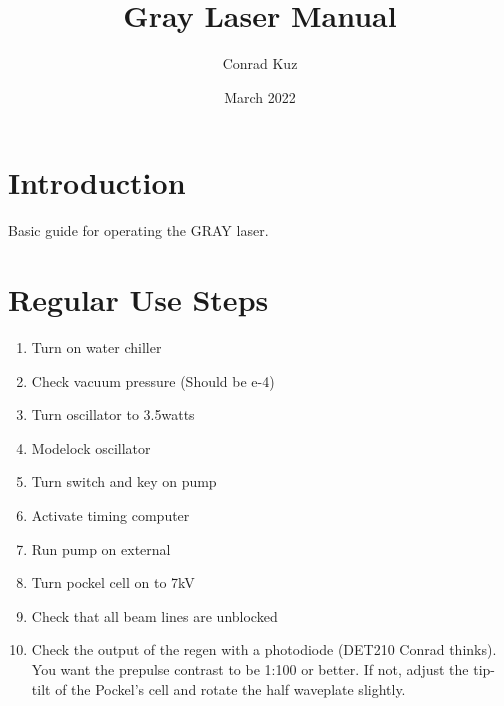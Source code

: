 \documentclass{article}
\title{Gray Laser Manual}
\author{Conrad Kuz}
\date{March 2022}
\begin{document}
\maketitle

\section{Introduction}
Basic guide for operating the GRAY laser.

\section{Regular Use Steps}
\begin{enumerate}
    \item Turn on water chiller
    \item Check vacuum pressure (Should be e-4)
    \item Turn oscillator to 3.5watts
    \item Modelock oscillator
    \item Turn switch and key on pump
    \item Activate timing computer
    \item Run pump on external
    \item Turn pockel cell on to 7kV
    \item Check that all beam lines are unblocked
    \item Check the output of the regen with a photodiode (DET210 Conrad thinks). You want the prepulse contrast to be 1:100 or better. If not, adjust the tip-tilt of the Pockel's cell and rotate the half waveplate slightly.
\end{enumerate}
\end{document}
